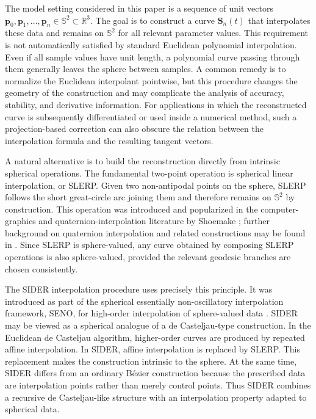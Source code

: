 \documentclass[a4paper,11pt]{article}
\newcommand{\bp}{\mathbf{p}}
\numberwithin{equation}{section}
\theoremstyle{plain}
\theoremstyle{definition}
\theoremstyle{remark}
\newcommand{\Sph}{\mathbb{S}^2}
\begin{document}
The model setting considered in this paper is a sequence of unit vectors
\(\bp_0,\bp_1,\ldots,\bp_n\in \Sph\subset \mathbb{R}^3 .\)
The goal is to construct a curve \(\mathbf{S}_n(t)\) that interpolates these data and remains on \(\Sph\) for all relevant parameter values.  This requirement is not automatically satisfied by standard Euclidean polynomial interpolation.  Even if all sample values have unit length, a polynomial curve passing through them generally leaves the sphere between samples.  A common remedy is to normalize the Euclidean interpolant pointwise, but this procedure changes the geometry of the construction and may complicate the analysis of accuracy, stability, and derivative information.  For applications in which the reconstructed curve is subsequently differentiated or used inside a numerical method, such a projection-based correction can also obscure the relation between the interpolation formula and the resulting tangent vectors.

A natural alternative is to build the reconstruction directly from intrinsic spherical operations.  The fundamental two-point operation is spherical linear interpolation, or SLERP.  Given two non-antipodal points on the sphere, SLERP follows the short great-circle arc joining them and therefore remains on \(\Sph\) by construction.  This operation was introduced and popularized in the computer-graphics and quaternion-interpolation literature by Shoemake \cite{shoemake_85}; further background on quaternion interpolation and related constructions may be found in \cite{dam_98}.  Since SLERP is sphere-valued, any curve obtained by composing SLERP operations is also sphere-valued, provided the relevant geodesic branches are chosen consistently.

The SIDER interpolation procedure uses precisely this principle.  It was introduced as part of the spherical essentially non-oscillatory interpolation framework, SENO, for high-order interpolation of sphere-valued data \cite{fonleu23}.  SIDER may be viewed as a spherical analogue of a de Casteljau-type construction.  In the Euclidean de Casteljau algorithm, higher-order curves are produced by repeated affine interpolation.  In SIDER, affine interpolation is replaced by SLERP.  This replacement makes the construction intrinsic to the sphere.  At the same time, SIDER differs from an ordinary B\'ezier construction because the prescribed data are interpolation points rather than merely control points.  Thus SIDER combines a recursive de Casteljau-like structure with an interpolation property adapted to spherical data.
\end{document}
